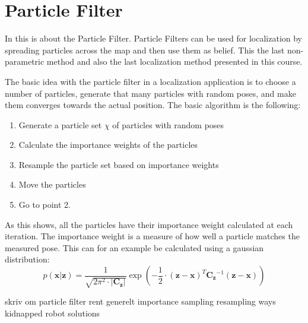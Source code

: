 \documentclass[Main]{subfiles}
\begin{document}
\section{Particle Filter} %
	\label{sec:particlefilter}
In this is about the Particle Filter. 
Particle Filters can be used for localization by spreading particles across the map and then use them as belief. This the last non-parametric method and also the last localization method presented in this course.

The basic idea with the particle filter in a localization application is to choose a number of particles, generate that many particles with random poses, and make them converges towards the actual position.
The basic algorithm is the following:
\begin{enumerate}
\item Generate a particle set $\chi$ of particles with random poses 
\item Calculate the importance weights of the particles 
\item Resample the particle set based on importance weights
\item Move the particles
\item Go to point 2.
\end{enumerate}
As this shows, all the particles have their importance weight calculated at each iteration.
The importance weight is a measure of how well a particle matches the measured pose.
This can for an example be calculated using a gaussian distribution:
\begin{equation}
	p(\mathbf{x}|\mathbf{z}) = \frac{1}{\sqrt{2\pi^2 \cdot |\mathbf{C_z}|}} \exp \left( -\frac{1}{2}\cdot (\mathbf{z}-\mathbf{x})^T \mathbf{C_z}^{-1} (\mathbf{z}-\mathbf{x}) \right)
\end{equation}


skriv om particle filter rent generelt
importance sampling
resampling ways
kidnapped robot solutions

\end{document}
